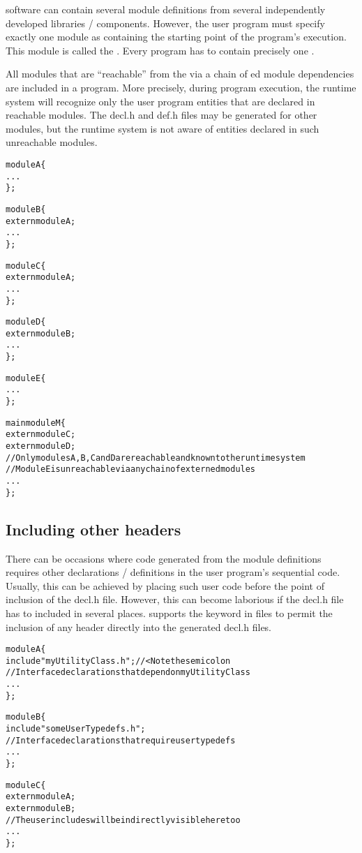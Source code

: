\charm software can contain several module definitions from several
independently developed libraries / components. However, the user program must
specify exactly one module as containing the starting point of the program's
execution. This module is called the . Every \charm program
has to contain precisely one .

All modules that are ``reachable'' from the  via a chain of
ed module dependencies are included in a \charm program. More
precisely, during program execution, the \charm runtime system will recognize
only the user program entities that are declared in reachable modules. The
decl.h and def.h files may be generated for other modules, but the runtime
system is not aware of entities declared in such unreachable modules.

\begin{alltt}
module A \{
    ...
\};

module B \{
    extern module A;
    ...
\};

module C \{
    extern module A;
    ...
\};

module D \{
    extern module B;
    ...
\};

module E \{
    ...
\};

mainmodule M \{
    extern module C;
    extern module D;
    // Only modules A, B, C and D are reachable and known to the runtime system
    // Module E is unreachable via any chain of externed modules
    ...
\};
\end{alltt}


\subsection{Including other headers}

There can be occasions where code generated from the module definitions
requires other declarations / definitions in the user program's sequential
code. Usually, this can be achieved by placing such user code before the point
of inclusion of the decl.h file. However, this can become laborious if the
decl.h file has to included in several places. \charm supports the keyword
 in \ci files to permit the inclusion of any header directly into
the generated decl.h files.

\begin{alltt}
module A \{
    include "myUtilityClass.h"; //< Note the semicolon
    // Interface declarations that depend on myUtilityClass
    ...
\};

module B \{
    include "someUserTypedefs.h";
    // Interface declarations that require user typedefs
    ...
\};

module C \{
    extern module A;
    extern module B;
    // The user includes will be indirectly visible here too
    ...
\};
\end{alltt}


